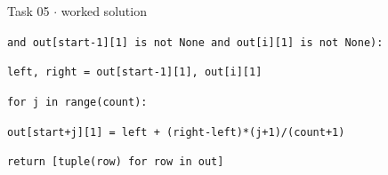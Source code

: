 \documentclass[11pt]{article}
\begin{document}
\begin{keepsection}
\begin{workedbox}{Task 05 \ensuremath{\cdot} worked solution}
\begin{enumerate}
\begin{tcolorbox}[colback=Paperblue,colframe=Paperblue,boxrule=0pt,arc=0pt,left=7pt,right=7pt,top=5pt,bottom=5pt]
\noindent\hspace*{7em}\texttt{and out[start-1][1] is not None and out[i][1] is not None):}\par
\noindent\hspace*{5em}\texttt{left, right = out[start-1][1], out[i][1]}\par
\noindent\hspace*{5em}\texttt{for j in range(count):}\par
\noindent\hspace*{7em}\texttt{out[start+j][1] = left + (right-left)*(j+1)/(count+1)}\par
\noindent\hspace*{1em}\texttt{return [tuple(row) for row in out]}\par
\end{tcolorbox}
\end{enumerate}
\end{workedbox}

\end{keepsection}
\end{document}
